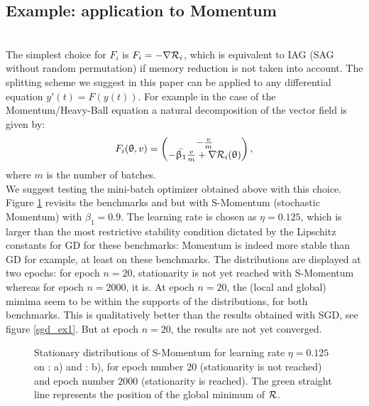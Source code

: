 \documentclass[article,authoryear,jmlmc]{beg_32}             %
\begin{document}
\subsection{Example: application to Momentum}
\label{mom}
~~\\
The simplest choice for $F_i$ is $F_i=-\nabla \mathcal{R}_i$, which is equivalent to IAG (SAG without random permutation) if memory reduction is not taken into account. %
	The splitting scheme we suggest in this paper can be applied to any differential equation $y'(t)=F(y(t))$. For example in the case of the Momentum/Heavy-Ball equation \cite{momentum_sutskever_RNN,Polyak,polyak_momentum_stability,continuous_general} a natural decomposition of the vector field is given by:
	\begin{equation*}
		F_i(\uptheta,v) = 
		\begin{pmatrix}
                  -\frac{v}{m} \\
                        -{\bar{\upbeta_1}}\frac{v}{m}+\nabla \mathcal{R}_i(\uptheta)
		\end{pmatrix},
	\end{equation*}
        where $m$ is the number of batches.\\ 
        We suggest testing the mini-batch optimizer obtained above with this choice. Figure \ref{mom_ex1_ex2} revisits the benchmarks \exOne and \exTwo but with S-Momentum (stochastic Momentum) with $\beta_1=0.9$. 
        The learning rate is chosen as $\eta=0.125$, which is larger than the most restrictive stability condition dictated by the Lipschitz constants for GD for these benchmarks:
        Momentum is indeed more stable than GD for example, at least on these benchmarks. 
        The distributions are displayed at two epochs: for epoch $n=20$, stationarity is not yet reached with S-Momentum whereas for epoch $n=2000$, it is.  
        At epoch $n=20$, the (local and global) mimima seem to be within the supports of the distributions, for both benchmarks. This 
        is qualitatively better than the results obtained with SGD, see figure \ref{sgd_ex1}. 
        But at epoch $n=20$, the results are not yet converged.  
\begin{figure}[!h]
	\centering
        \scalebox{0.60}{}
	\scalebox{0.60}{}
        \caption{Stationary distributions of S-Momentum for learning rate $\eta=0.125$ on \exOne: a) and \exTwo: b), for epoch number $20$ (stationarity is not reached) and epoch number $2000$ (stationarity is reached). The green straight line represents the position of the global minimum of $\mathcal{R}$.}
	\label{mom_ex1_ex2}
\end{figure}
\end{document}
